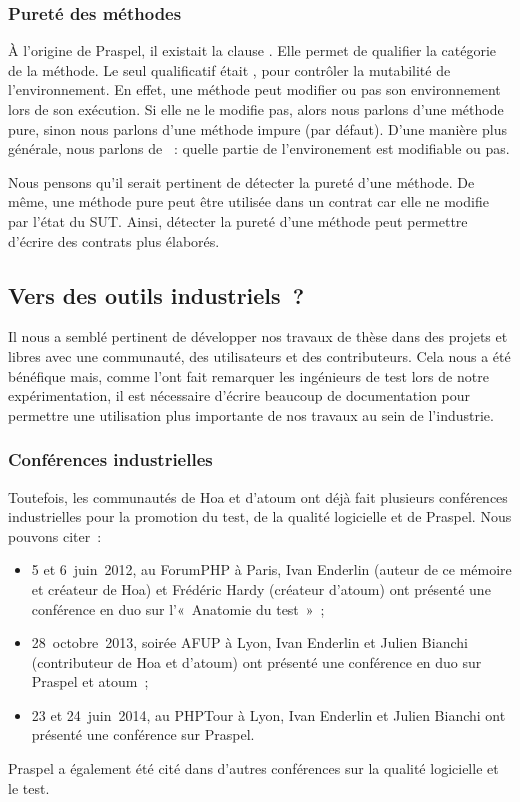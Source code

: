 \subsubsection{Pureté des méthodes}

À l'origine de Praspel, il existait la clause \ais. Elle permet de qualifier la
catégorie de la méthode. Le seul qualificatif était , pour contrôler
la mutabilité de l'environnement. En effet, une méthode peut modifier ou pas son
environnement lors de son exécution. Si elle ne le modifie pas, alors nous
parlons d'une méthode pure, sinon nous parlons d'une méthode impure (par
défaut). D'une manière plus générale, nous parlons de ~: quelle partie de l'environement est modifiable ou pas.

Nous pensons qu'il serait pertinent de détecter la pureté d'une méthode. De
même, une méthode pure peut être utilisée dans un contrat car elle ne modifie
par l'état du SUT. Ainsi, détecter la pureté d'une méthode peut permettre
d'écrire des contrats plus élaborés.

\subsection{Vers des outils industriels~?}

Il nous a semblé pertinent de développer nos travaux de thèse dans des projets
 et libres avec une communauté, des utilisateurs et des
contributeurs. Cela nous a été bénéfique mais, comme l'ont fait remarquer les
ingénieurs de test lors de notre expérimentation, il est nécessaire d'écrire
beaucoup de documentation pour permettre une utilisation plus importante de nos
travaux au sein de l'industrie.

\subsubsection{Conférences industrielles}

Toutefois, les communautés de Hoa et d'atoum ont déjà fait plusieurs conférences
industrielles pour la promotion du test, de la qualité logicielle et de Praspel.
Nous pouvons citer~:
%
\begin{itemize}

\item 5 et 6~juin~2012, au ForumPHP à Paris, Ivan Enderlin (auteur de ce mémoire
et créateur de Hoa) et Frédéric Hardy (créateur d'atoum) ont présenté une
conférence en duo sur l'«~Anatomie du test~»~;

\item 28~octobre~2013, soirée AFUP à Lyon, Ivan Enderlin et Julien Bianchi
(contributeur de Hoa et d'atoum) ont présenté une conférence en duo sur Praspel
et atoum~;

\item 23 et 24~juin~2014, au PHPTour à Lyon, Ivan Enderlin et Julien Bianchi ont
présenté une conférence sur Praspel.

\end{itemize}
%
Praspel a également été cité dans d'autres conférences sur la qualité logicielle
et le test.

